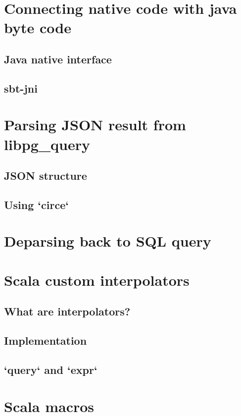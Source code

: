 \documentclass[thesis=B,english]{FITthesis}[2019/12/23]
\begin{document}
\section{Connecting native code with java byte code}

\subsection{Java native interface}

\subsection{sbt-jni}

\section{Parsing JSON result from libpg\_query}

\subsection{JSON structure}

\subsection{Using `circe`}

\section{Deparsing back to SQL query}

\section{Scala custom interpolators}

\subsection{What are interpolators?}

\subsection{Implementation}

\subsection{`query` and `expr`}

\section{Scala macros}
\end{document}
